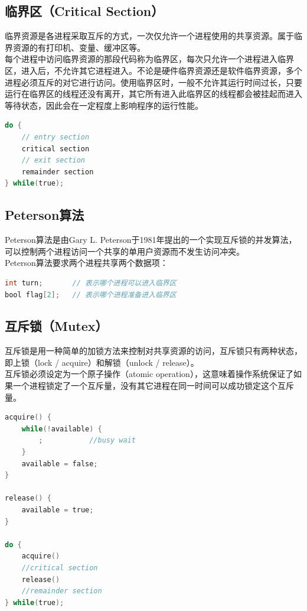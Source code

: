 \subsection{临界区（Critical Section）}

临界资源是各进程采取互斥的方式，一次仅允许一个进程使用的共享资源。属于临界资源的有打印机、变量、缓冲区等。 \\

每个进程中访问临界资源的那段代码称为临界区，每次只允许一个进程进入临界区，进入后，不允许其它进程进入。不论是硬件临界资源还是软件临界资源，多个进程必须互斥的对它进行访问。使用临界区时，一般不允许其运行时间过长，只要运行在临界区的线程还没有离开，其它所有进入此临界区的线程都会被挂起而进入等待状态，因此会在一定程度上影响程序的运行性能。

\begin{lstlisting}[language=C, title=临界区]
do {
	// entry section
	critical section
	// exit section
	remainder section
} while(true);
\end{lstlisting}

\subsection{Peterson算法}

Peterson算法是由Gary L. Peterson于1981年提出的一个实现互斥锁的并发算法，可以控制两个进程访问一个共享的单用户资源而不发生访问冲突。 \\

Peterson算法要求两个进程共享两个数据项：

\begin{lstlisting}[language=C, title=Peterson算法]
int turn;		// 表示哪个进程可以进入临界区
bool flag[2];	// 表示哪个进程准备进入临界区
\end{lstlisting}

\subsection{互斥锁（Mutex）}

互斥锁是用一种简单的加锁方法来控制对共享资源的访问，互斥锁只有两种状态，即上锁（lock / acquire）和解锁（unlock / release）。 \\

互斥锁必须设定为一个原子操作（atomic operation），这意味着操作系统保证了如果一个进程锁定了一个互斥量，没有其它进程在同一时间可以成功锁定这个互斥量。

\begin{lstlisting}[language=C, title=互斥锁]
acquire() {
	while(!available) {
		;			//busy wait
	}
	available = false;
}

release() {
	available = true;
}

do {
	acquire()
	//critical section
	release()
	//remainder section
} while(true);
\end{lstlisting}

